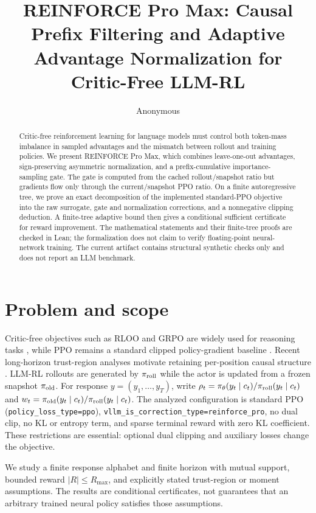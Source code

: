 \documentclass[10pt]{article}
\title{REINFORCE Pro Max: Causal Prefix Filtering and
Adaptive Advantage Normalization for Critic-Free LLM-RL}
\author{Anonymous}
\date{}
\begin{document}
\maketitle

\begin{abstract}
Critic-free reinforcement learning for language models must control both
token-mass imbalance in sampled advantages and the mismatch between rollout and
training policies. We present REINFORCE Pro Max, which combines leave-one-out
advantages, sign-preserving asymmetric normalization, and a prefix-cumulative
importance-sampling gate. The gate is computed from the cached rollout/snapshot
ratio but gradients flow only through the current/snapshot PPO ratio. On a
finite autoregressive tree, we prove an exact decomposition of the implemented
standard-PPO objective into the raw surrogate, gate and normalization
corrections, and a nonnegative clipping deduction. A finite-tree adaptive
bound then gives a conditional sufficient certificate for reward improvement.
The mathematical statements and their finite-tree proofs are checked in Lean;
the formalization does not claim to verify floating-point neural-network
training. The current artifact contains structural synthetic checks only and
does not report an LLM benchmark.
\end{abstract}

\section{Problem and scope}
Critic-free objectives such as RLOO and GRPO are widely used for reasoning
tasks \citep{ahmadian2024back,shao2024deepseekmath}, while PPO remains a
standard clipped policy-gradient baseline \citep{schulman2017proximal}. Recent
long-horizon trust-region analyses motivate retaining per-position causal
structure \citep{li2025trm}.
LLM-RL rollouts are generated by $\pi_{\rm roll}$ while the actor is updated
from a frozen snapshot $\pi_{\rm old}$. For response $y=(y_1,\ldots,y_T)$,
write $\rho_t=\pi_\theta(y_t\mid c_t)/\pi_{\rm roll}(y_t\mid c_t)$ and
$w_t=\pi_{\rm old}(y_t\mid c_t)/\pi_{\rm roll}(y_t\mid c_t)$. The analyzed
configuration is standard PPO (\texttt{policy\_loss\_type=ppo}),
\texttt{vllm\_is\_correction\_type=reinforce\_pro}, no dual clip, no KL or entropy
term, and sparse terminal reward with zero KL coefficient. These restrictions
are essential: optional dual clipping and auxiliary losses change the objective.

We study a finite response alphabet and finite horizon with mutual support,
bounded reward $|R|\le R_{\max}$, and explicitly stated trust-region or
moment assumptions. The results are conditional certificates, not guarantees
that an arbitrary trained neural policy satisfies those assumptions.
\end{document}
